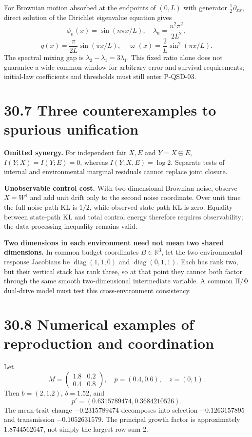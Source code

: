 \documentclass[
  english,
  11pt,
  oneside]{book}
\begin{document}
For Brownian motion absorbed at the endpoints of \((0,L)\) with generator \(\frac12\partial_{xx}\), direct solution of the Dirichlet eigenvalue equation gives \[\phi_n(x)=\sin(n\pi x/L),\quad
\lambda_n=\frac{n^2\pi^2}{2L^2},\] \[q(x)=\frac{\pi}{2L}\sin(\pi x/L),\quad
\varpi(x)=\frac2L\sin^2(\pi x/L).\] The spectral mixing gap is \(\lambda_2-\lambda_1=3\lambda_1\). This fixed ratio alone does not guarantee a wide common window for arbitrary error and survival requirements; initial-law coefficients and thresholds must still enter P-QSD-03.

\section{30.7 Three counterexamples to spurious unification}\label{three-counterexamples-to-spurious-unification}

\textbf{Omitted synergy.} For independent fair \(X,E\) and \(Y=X\oplus E\), \(I(Y;X)=I(Y;E)=0\), whereas \(I(Y;X,E)=\log2\). Separate tests of internal and environmental marginal residuals cannot replace joint closure.

\textbf{Unobservable control cost.} With two-dimensional Brownian noise, observe \(X=W^1\) and add unit drift only to the second noise coordinate. Over unit time the full noise-path KL is \(1/2\), while observed state-path KL is zero. Equality between state-path KL and total control energy therefore requires observability; the data-processing inequality remains valid.

\textbf{Two dimensions in each environment need not mean two shared dimensions.} In common budget coordinates \(B\in\mathbb R^3\), let the two environmental response Jacobians be \(\operatorname{diag}(1,1,0)\) and \(\operatorname{diag}(0,1,1)\). Each has rank two, but their vertical stack has rank three, so at that point they cannot both factor through the same smooth two-dimensional intermediate variable. A common Π/Φ dual-drive model must test this cross-environment consistency.

\section{30.8 Numerical examples of reproduction and coordination}\label{numerical-examples-of-reproduction-and-coordination}

Let \[M=\begin{pmatrix}1.8&0.2\\0.4&0.8\end{pmatrix},\quad
p=(0.4,0.6),\quad z=(0,1).\] Then \(b=(2,1.2)\), \(\bar b=1.52\), and \[p'=(0.6315789474,0.3684210526).\] The mean-trait change \(-0.2315789474\) decomposes into selection \(-0.1263157895\) and transmission \(-0.1052631579\). The principal growth factor is approximately \(1.8744562647\), not simply the largest row sum 2.
\end{document}
